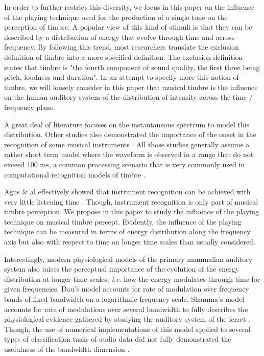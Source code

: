 \documentclass{article}
\begin{document}
In order to further restrict this diversity, we focus in this paper on the influence of the playing technique used for the production of a single tone on the perception of timbre. A popular view of this kind of stimuli is that they can be described by a distribution of energy that evolve through time and across frequency. By following this trend, most researchers translate the exclusion definition of timbre \cite{marozeau2003dependency} into a more specified definition. The exclusion definition states that timbre is "the fourth component of sound quality, the first three being pitch, loudness and duration". In an attempt to specify more this notion of timbre, we will loosely consider in this paper that musical timbre is the influence on the human auditory system of the distribution of intensity across the time / frequency plane.

A great deal of literature focuses on the instantaneous spectrum \cite{grey1978perceptual} to model this distribution. Other studies also demonstrated the importance of the onset in the recognition of some musical instruments \cite{eronen2001comparison}. All those studies generally assume a rather short term model where the waveform is observed in a range that do not exceed 100 ms, a common processing scenario that is very commonly used in computational recognition models of timbre \cite{tzanetakis2002musical}.

Agus \& al effectively showed that instrument recognition can be achieved with very little listening time \cite{agus2012fast}. Though, instrument recognition is only part of musical timbre perception. We propose in this paper to study the influence of the playing technique on musical timbre percept. Evidently, the influence of the playing technique can be measured in terms of energy distribution along the frequency axis but also with respect to time on longer time scales than usually considered.

Interestingly, modern physiological models of the primary mammalian auditory system also raises the perceptual importance of the evolution of the energy distribution at longer time scales, \textit{i.e.} how the energy modulates through time for given frequencies.  Dau's model accounts for  rate of modulation over frequency bands of fixed bandwidth on a logarithmic frequency scale\cite{dau1997modeling}. Shamma's model accounts for rate  of modulations over several bandwidth to fully describes the physiological evidence gathered by studying the auditory system of the ferret \cite{yang1992auditory}. Though, the use of numerical implementations of this model applied to several types of classification tasks of audio data did not fully demonstrated the usefulness of the bandwidth dimension \cite{mesgarani2006discrimination}.
\end{document}
